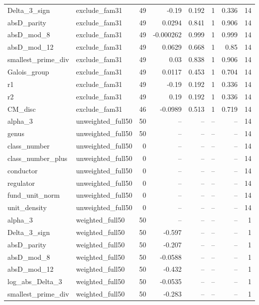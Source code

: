 \begin{tabular}{llrrrrrr}
Delta\_3\_sign & exclude\_fam31 & 49 & -0.19 & 0.192 & 1 & 0.336 & 14 \\
absD\_parity & exclude\_fam31 & 49 & 0.0294 & 0.841 & 1 & 0.906 & 14 \\
absD\_mod\_8 & exclude\_fam31 & 49 & -0.000262 & 0.999 & 1 & 0.999 & 14 \\
absD\_mod\_12 & exclude\_fam31 & 49 & 0.0629 & 0.668 & 1 & 0.85 & 14 \\
smallest\_prime\_div & exclude\_fam31 & 49 & 0.03 & 0.838 & 1 & 0.906 & 14 \\
Galois\_group & exclude\_fam31 & 49 & 0.0117 & 0.453 & 1 & 0.704 & 14 \\
r1 & exclude\_fam31 & 49 & -0.19 & 0.192 & 1 & 0.336 & 14 \\
r2 & exclude\_fam31 & 49 & 0.19 & 0.192 & 1 & 0.336 & 14 \\
CM\_disc & exclude\_fam31 & 46 & -0.0989 & 0.513 & 1 & 0.719 & 14 \\
alpha\_3 & unweighted\_full50 & 50 & -- & -- & -- & -- & 14 \\
genus & unweighted\_full50 & 50 & -- & -- & -- & -- & 14 \\
class\_number & unweighted\_full50 & 0 & -- & -- & -- & -- & 14 \\
class\_number\_plus & unweighted\_full50 & 0 & -- & -- & -- & -- & 14 \\
conductor & unweighted\_full50 & 0 & -- & -- & -- & -- & 14 \\
regulator & unweighted\_full50 & 0 & -- & -- & -- & -- & 14 \\
fund\_unit\_norm & unweighted\_full50 & 0 & -- & -- & -- & -- & 14 \\
unit\_density & unweighted\_full50 & 0 & -- & -- & -- & -- & 14 \\
alpha\_3 & weighted\_full50 & 50 & -- & -- & -- & -- & 1 \\
Delta\_3\_sign & weighted\_full50 & 50 & -0.597 & -- & -- & -- & 1 \\
absD\_parity & weighted\_full50 & 50 & -0.207 & -- & -- & -- & 1 \\
absD\_mod\_8 & weighted\_full50 & 50 & -0.0588 & -- & -- & -- & 1 \\
absD\_mod\_12 & weighted\_full50 & 50 & -0.432 & -- & -- & -- & 1 \\
log\_abs\_Delta\_3 & weighted\_full50 & 50 & -0.0535 & -- & -- & -- & 1 \\
smallest\_prime\_div & weighted\_full50 & 50 & -0.283 & -- & -- & -- & 1 \\

\end{tabular}

